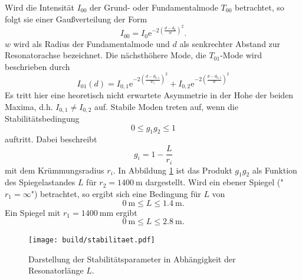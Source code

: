 Wird die Intensität $I_{00}$ der Grund- oder Fundamentalmode $T_{00}$ betrachtet, so
folgt sie einer Gaußverteilung der Form
\begin{equation}
  I_{00} = I_0 \text{e}^{-2\left(\frac{d-d_0}{w}\right)^2}.
\end{equation}
$w$ wird als Radius der Fundamentalmode und $d$ als senkrechter Abstand zur Resonatorachse
bezeichnet. Die nächsthöhere Mode, die $T_{01}$-Mode wird beschrieben durch
\begin{equation}
  I_{01}(d) = I_{0,1}\text{e}^{-2\left(\frac{d-d_{0,1}}{w_1}\right)^2}+I_{0,2}\text{e}^{-2\left(\frac{d-d_{0,2}}{w}\right)^2}
\end{equation}
Es tritt hier eine heoretisch nicht erwartete Asymmetrie in der Hohe der beiden Maxima,
d.h. $I_{0,1} \neq I_{0,2}$ auf.
Stabile Moden treten auf, wenn die Stabilitätsbedingung
\begin{equation}
  0\leq g_1g_2\leq 1
\end{equation}
auftritt. Dabei beschreibt
\begin{equation}
  g_i = 1 - \frac{L}{r_i}
\end{equation}
mit dem Krümmungsradius $r_i$. In Abbildung \ref{fig:stabilität} ist das Produkt $g_1g_2$
als Funktion des Spiegelastandes $L$  für $r_2 = \SI{1400}{\metre}$ dargestellt. Wird ein
ebener Spiegel ("$r_1 = \infty$") betrachtet, so ergibt sich eine Bedingung für
$L$ von
\begin{equation}
  \SI{0}{\metre} \leq L \leq \SI{1.4}{\metre}.
\end{equation}
Ein Spiegel mit $r_1 = \SI{1400}{\milli\metre}$ ergibt
\begin{equation}
    \SI{0}{\metre} \leq L \leq \SI{2.8}{\metre}.
\end{equation}

\begin{figure}
  \centering
  \texttt{[image: build/stabilitaet.pdf]}
  \caption{Darstellung der Stabilitätsparameter in Abhängigkeit der
  Resonatorlänge $L$.}
  \label{fig:stabilität}
\end{figure}

